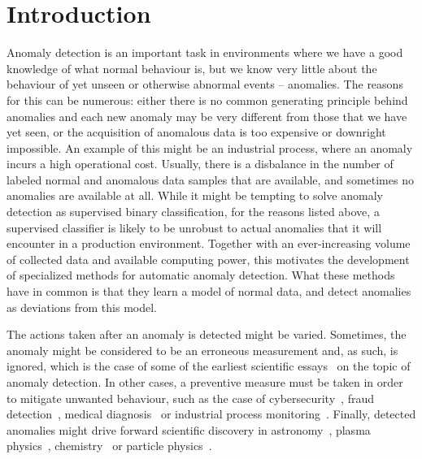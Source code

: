 \chapter{Introduction} \label{sec:chapter_intro}
Anomaly detection is an important task in environments where we have a good knowledge of what normal behaviour is, but we know very little about the behaviour of yet unseen or otherwise abnormal events -- anomalies. The reasons for this can be numerous: either there is no common generating principle behind anomalies and each new anomaly may be very different from those that we have yet seen, or the acquisition of anomalous data is too expensive or downright impossible. An example of this might be an industrial process, where an anomaly incurs a high operational cost. Usually, there is a disbalance in the number of labeled normal and anomalous data samples that are available, and sometimes no anomalies are available at all. While it might be tempting to solve anomaly detection as supervised binary classification, for the reasons listed above, a supervised classifier is likely to be unrobust to actual anomalies that it will encounter in a production environment. Together with an ever-increasing volume of collected data and available computing power, this motivates the development of specialized methods for automatic anomaly detection. What these methods have in common is that they learn a model of normal data, and detect anomalies as deviations from this model. 

The actions taken after an anomaly is detected might be varied. Sometimes, the anomaly might be considered to be an erroneous measurement and, as such, is ignored, which is the case of some of the earliest scientific essays~\cite{glaisher1873rejection,edgeworth1887xli} on the topic of anomaly detection. In other cases, a preventive measure must be taken in order to mitigate unwanted behaviour, such as the case of cybersecurity~\cite{liao2013intrusion, vanerio2017ensemble,xin2018machine}, fraud detection~\cite{bolton2002statistical, perols2011financial, ahmed2016survey}, medical diagnosis~\cite{tarassenko1995novelty, wong2003bayesian, iakovidis2018detecting,zhou2019anomalynet} or industrial process monitoring~\cite{mahmoudi2019layerwise, bai2020anomaly, choi2020gan}. Finally, detected anomalies might drive forward scientific discovery in astronomy~\cite{protopapas2006finding}, plasma physics~\cite{vskvara2020detection}, chemistry~\cite{oprea2002chemical} or particle physics~\cite{fraser2022challenges}.

